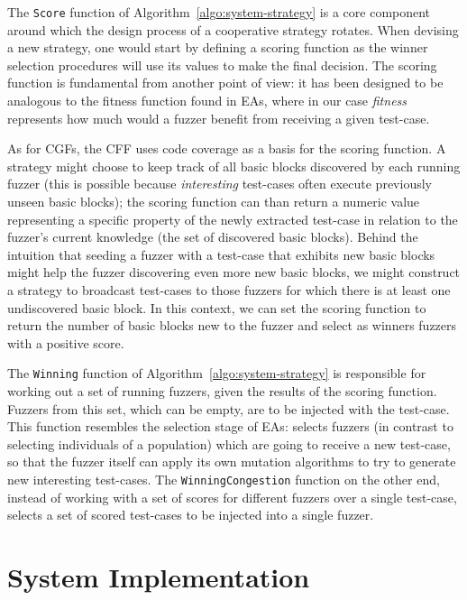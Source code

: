 The \texttt{Score} function of Algorithm~\ref{algo:system-strategy} is a core
component around which the design process of a cooperative strategy rotates.
When devising a new strategy, one would start by defining a scoring function as
the winner selection procedures will use its values to make the final decision.
The scoring function is fundamental from another point of view: it has been
designed to be analogous to the fitness function found in \acp{EA}, where in our
case \emph{fitness} represents how much would a fuzzer benefit from receiving a
given test-case.

As for \acp{CGF}, the \ac{CFF} uses code coverage as a basis for the scoring
function. A strategy might choose to keep track of all basic blocks discovered
by each running fuzzer (this is possible because \emph{interesting} test-cases
often execute previously unseen basic blocks); the scoring function can than
return a numeric value representing a specific property of the newly extracted
test-case in relation to the fuzzer's current knowledge (the set of discovered
basic blocks). Behind the intuition that seeding a fuzzer with a test-case that
exhibits new basic blocks might help the fuzzer discovering even more new basic
blocks, we might construct a strategy to broadcast test-cases to those fuzzers
for which there is at least one undiscovered basic block. In this context, we
can set the scoring function to return the number of basic blocks new to the
fuzzer and select as winners fuzzers with a positive score. %

The \texttt{Winning} function of Algorithm~\ref{algo:system-strategy} is
responsible for working out a set of running fuzzers, given the results of the
scoring function. Fuzzers from this set, which can be empty, are to be injected
with the test-case. This function resembles the selection stage of \acp{EA}:
selects fuzzers (in contrast to selecting individuals of a population) which are
going to receive a new test-case, so that the fuzzer itself can apply its own
mutation algorithms to try to generate new interesting test-cases. The
\texttt{WinningCongestion} function on the other end, instead of working with a
set of scores for different fuzzers over a single test-case, selects a set of
scored test-cases to be injected into a single fuzzer.

\section{System Implementation}

